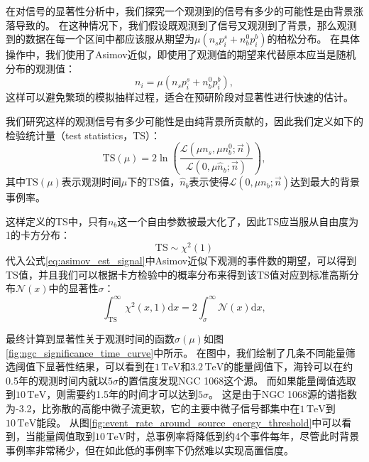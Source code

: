 在对信号的显著性分析中，我们探究一个观测到的信号有多少的可能性是由背景涨落导致的。
在这种情况下，我们假设既观测到了信号又观测到了背景，那么观测到的数据在每一个区间中都应该服从期望为$\mu(n_s p_i^s +  n_b^0 p_i^b)$的柏松分布。
在具体操作中，我们使用了Asimov近似\cite{Cowan_Asimov_estimate:2010}，即使用了观测值的期望来代替原本应当是随机分布的观测值：
\begin{equation}
    n_i = \mu(n_s p_i^s +  n_b^0 p_i^b) ,
    \label{eq:asimov_est_signal}
\end{equation}
这样可以避免繁琐的模拟抽样过程，适合在预研阶段对显著性进行快速的估计。

我们研究这样的观测信号有多少可能性是由纯背景所贡献的，因此我们定义如下的检验统计量（test statistics，TS）：
\begin{equation}
    \mathrm{TS}(\mu) = 2 \ln \left( \frac
    {\mathcal{L}(\mu n_s, \mu n_b^0; \vec{n})} 
    {\mathcal{L}(0, \mu \hat{n}_b; \vec{n})} \right) ,
    \label{eq:ts_significance}
\end{equation}
其中$\mathrm{TS}(\mu)$表示观测时间$\mu$下的TS值，$\hat{n}_b$表示使得$\mathcal{L}(0, \mu n_b; \vec{n})$达到最大的背景事例率。

这样定义的TS中，只有$n_b$这一个自由参数被最大化了，因此TS应当服从自由度为1的卡方分布\cite{Cowan:1998}：
\begin{equation}
    \mathrm{TS} \sim \chi^2(1)
\end{equation}
代入公式\ref{eq:asimov_est_signal}中Asimov近似下观测的事件数的期望，可以得到TS值，并且我们可以根据卡方检验中的概率分布来得到该TS值对应到标准高斯分布$\mathcal{N}(x)$中的显著性$\sigma$：
\begin{equation}
    \int^\infty_\mathrm{TS} \chi^2(x, 1) \mathrm{d}x = 
    2 \int^\infty_\sigma \mathcal{N}(x) \mathrm{d}x ,
    \label{eq:ts_to_sigma}
\end{equation}

最终计算到显著性关于观测时间的函数$\sigma(\mu)$如图\ref{fig:ngc_significance_time_curve}中所示。
在图中，我们绘制了几条不同能量筛选阈值下显著性结果，可以看到在$1\,\mathrm{TeV}$和$3.2\,\mathrm{TeV}$的能量阈值下，海铃可以在约0.5年的观测时间内就以$5\sigma$的置信度发现NGC 1068这个源。
而如果能量阈值选取到$10\,\mathrm{TeV}$，则需要约1.5年的时间才可以达到$5\sigma$。
这是由于NGC 1068源的谱指数为-3.2，比弥散的高能中微子流更软，它的主要中微子信号都集中在$1\,\mathrm{TeV}$到$10\,\mathrm{TeV}$能段。
从图\ref{fig:event_rate_around_source_energy_threshold}中可以看到，当能量阈值取到$10\,\mathrm{TeV}$时，总事例率将降低到约4个事件每年，尽管此时背景事例率非常稀少，但在如此低的事例率下仍然难以实现高置信度。

